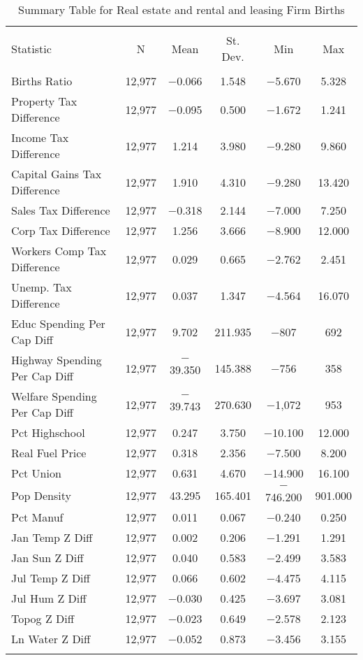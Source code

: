 
\begin{table}[!htbp] \centering 
  \caption{Summary Table for  Real estate and rental and leasing Firm Births} 
  \label{53summary} 
\begin{tabular}{@{\extracolsep{5pt}}lccccc} 
\\[-1.8ex]\hline 
\hline \\[-1.8ex] 
Statistic & \multicolumn{1}{c}{N} & \multicolumn{1}{c}{Mean} & \multicolumn{1}{c}{St. Dev.} & \multicolumn{1}{c}{Min} & \multicolumn{1}{c}{Max} \\ 
\hline \\[-1.8ex] 
Births Ratio & 12,977 & $-$0.066 & 1.548 & $-$5.670 & 5.328 \\ 
Property Tax Difference & 12,977 & $-$0.095 & 0.500 & $-$1.672 & 1.241 \\ 
Income Tax Difference & 12,977 & 1.214 & 3.980 & $-$9.280 & 9.860 \\ 
Capital Gains Tax Difference & 12,977 & 1.910 & 4.310 & $-$9.280 & 13.420 \\ 
Sales Tax Difference & 12,977 & $-$0.318 & 2.144 & $-$7.000 & 7.250 \\ 
Corp Tax Difference & 12,977 & 1.256 & 3.666 & $-$8.900 & 12.000 \\ 
Workers Comp Tax Difference & 12,977 & 0.029 & 0.665 & $-$2.762 & 2.451 \\ 
Unemp. Tax Difference & 12,977 & 0.037 & 1.347 & $-$4.564 & 16.070 \\ 
Educ Spending Per Cap Diff & 12,977 & 9.702 & 211.935 & $-$807 & 692 \\ 
Highway Spending Per Cap Diff & 12,977 & $-$39.350 & 145.388 & $-$756 & 358 \\ 
Welfare Spending Per Cap Diff & 12,977 & $-$39.743 & 270.630 & $-$1,072 & 953 \\ 
Pct Highschool & 12,977 & 0.247 & 3.750 & $-$10.100 & 12.000 \\ 
Real Fuel Price & 12,977 & 0.318 & 2.356 & $-$7.500 & 8.200 \\ 
Pct Union & 12,977 & 0.631 & 4.670 & $-$14.900 & 16.100 \\ 
Pop Density & 12,977 & 43.295 & 165.401 & $-$746.200 & 901.000 \\ 
Pct Manuf & 12,977 & 0.011 & 0.067 & $-$0.240 & 0.250 \\ 
Jan Temp Z Diff & 12,977 & 0.002 & 0.206 & $-$1.291 & 1.291 \\ 
Jan Sun Z Diff & 12,977 & 0.040 & 0.583 & $-$2.499 & 3.583 \\ 
Jul Temp Z Diff & 12,977 & 0.066 & 0.602 & $-$4.475 & 4.115 \\ 
Jul Hum Z Diff & 12,977 & $-$0.030 & 0.425 & $-$3.697 & 3.081 \\ 
Topog Z Diff & 12,977 & $-$0.023 & 0.649 & $-$2.578 & 2.123 \\ 
Ln Water Z Diff & 12,977 & $-$0.052 & 0.873 & $-$3.456 & 3.155 \\ 
\hline \\[-1.8ex] 
\end{tabular} 
\end{table} 
